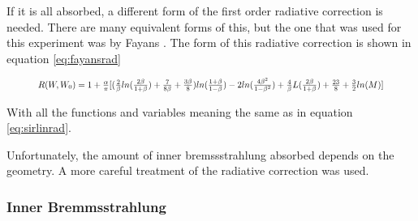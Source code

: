 \documentclass[../MaxHughesThesis.tex]{subfiles}
\begin{document}
If it is all absorbed, a different form of the first order radiative correction is needed.
There are many equivalent forms of this, but the one that was used for this experiment was by Fayans \cite{Fay86}.
The form of this radiative correction is shown in equation \ref{eq:fayansrad}

\begin{equation}	
	\resizebox{.9\textwidth}{!}
	{
	$R(W,W_{0}) = 1 + \frac{\alpha}{\pi}[(\frac{2}{\beta}ln(\frac{2\beta}{1+\beta}) + \frac{7}{8\beta} + \frac{3\beta}{8})ln(\frac{1 + \beta}{1 - \beta}) - 2ln(\frac{4\beta^{2}}{1 - \beta^{2}}) + \frac{4}{\beta}L(\frac{2\beta}{1+\beta}) + \frac{23}{8} + \frac{3}{2}ln(M)]$
	}
	\label{eq:fayansrad}
\end{equation}

With all the functions and variables meaning the same as in equation \ref{eq:sirlinrad}.

Unfortunately, the amount of inner bremssstrahlung absorbed depends on the geometry.
A more careful treatment of the radiative correction was used.

\subsubsection{Inner Bremmsstrahlung}
\end{document}
